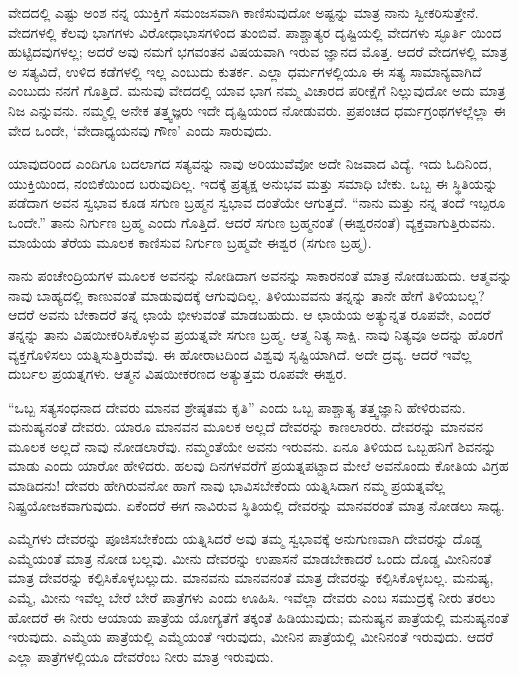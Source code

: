 ವೇದದಲ್ಲಿ ಎಷ್ಟು ಅಂಶ ನನ್ನ ಯುಕ್ತಿಗೆ ಸಮಂಜಸವಾಗಿ ಕಾಣಿಸುವುದೋ ಅಷ್ಟನ್ನು ಮಾತ್ರ ನಾನು ಸ್ವೀಕರಿಸುತ್ತೇನೆ. ವೇದಗಳಲ್ಲಿ ಕೆಲವು ಭಾಗಗಳು ವಿರೋಧಾಭಾಸಗಳಿಂದ ತುಂಬಿವೆ. ಪಾಶ್ಚಾತ್ಯರ ದೃಷ್ಟಿಯಲ್ಲಿ ವೇದಗಳು ಸ್ಫೂರ್ತಿ ಯಿಂದ ಹುಟ್ಟಿದವುಗಳಲ್ಲ; ಅದರೆ ಅವು ನಮಗೆ ಭಗವಂತನ ವಿಷಯವಾಗಿ ಇರುವ ಜ್ಞಾನದ ಮೊತ್ತ. ಆದರೆ ವೇದಗಳಲ್ಲಿ ಮಾತ್ರ ಅ ಸತ್ಯವಿದೆ, ಉಳಿದ ಕಡೆಗಳಲ್ಲಿ ಇಲ್ಲ ಎಂಬುದು ಕುತರ್ಕ. ಎಲ್ಲಾ ಧರ್ಮಗಳಲ್ಲಿಯೂ ಈ ಸತ್ಯ ಸಾಮಾನ್ಯವಾಗಿದೆ ಎಂಬುದು ನನಗೆ ಗೊತ್ತಿದೆ. ಮನುವು ವೇದದಲ್ಲಿ ಯಾವ ಭಾಗ ನಮ್ಮ ವಿಚಾರದ ಪರೀಕ್ಷೆಗೆ ನಿಲ್ಲುವುದೋ ಅದು ಮಾತ್ರ ನಿಜ ಎನ್ನುವನು. ನಮ್ಮಲ್ಲಿ ಅನೇಕ ತತ್ತ್ವಜ್ಞರು ಇದೇ ದೃಷ್ಟಿಯಂದ ನೋಡುವರು. ಪ್ರಪಂಚದ ಧರ್ಮಗ್ರಂಥಗಳಲ್ಲೆಲ್ಲಾ ಈ ವೇದ ಒಂದೇ, ‘ವೇದಾಧ್ಯಯನವು ಗೌಣ’ ಎಂದು ಸಾರುವುದು.

ಯಾವುದರಿಂದ ಎಂದಿಗೂ ಬದಲಾಗದ ಸತ್ಯವನ್ನು ನಾವು ಅರಿಯುವೆವೋ ಅದೇ ನಿಜವಾದ ವಿದ್ಯೆ. ಇದು ಓದಿನಿಂದ, ಯುಕ್ತಿಯಿಂದ, ನಂಬಿಕೆಯಿಂದ ಬರುವುದಿಲ್ಲ. ಇದಕ್ಕೆ ಪ್ರತ್ಯಕ್ಷ ಅನುಭವ ಮತ್ತು ಸಮಾಧಿ ಬೇಕು. ಒಬ್ಬ ಈ ಸ್ಥಿತಿಯನ್ನು ಪಡೆದಾಗ ಅವನ ಸ್ವಭಾವ ಕೂಡ ಸಗುಣ ಬ್ರಹ್ಮನ ಸ್ವಭಾವ ದಂತೆಯೇ ಆಗುತ್ತದೆ. “ನಾನು ಮತ್ತು ನನ್ನ ತಂದೆ ಇಬ್ಪರೂ ಒಂದೇ.” ತಾನು ನಿರ್ಗುಣ ಬ್ರಹ್ಮ ಎಂದು ಗೊತ್ತಿದೆ. ಆದರೆ ಸಗುಣ ಬ್ರಹ್ಮನಂತೆ (ಈಶ್ವರನಂತೆ) ವ್ಯಕ್ತವಾಗುತ್ತಿರುವನು. ಮಾಯೆಯ ತೆರೆಯ ಮೂಲಕ ಕಾಣಿಸುವ ನಿರ್ಗುಣ ಬ್ರಹ್ಮವೇ ಈಶ್ವರ (ಸಗುಣ ಬ್ರಹ್ಮ).

ನಾನು ಪಂಚೇಂದ್ರಿಯಗಳ ಮೂಲಕ ಅವನನ್ನು ನೋಡಿದಾಗ ಅವನನ್ನು ಸಾಕಾರನಂತೆ ಮಾತ್ರ ನೋಡಬಹುದು. ಆತ್ಮವನ್ನು ನಾವು ಬಾಹ್ಯದಲ್ಲಿ ಕಾಣುವಂತೆ ಮಾಡುವುದಕ್ಕೆ ಆಗುವುದಿಲ್ಲ. ತಿಳಿಯುವವನು ತನ್ನನ್ನು ತಾನೇ ಹೇಗೆ ತಿಳಿಯಬಲ್ಲ? ಆದರೆ ಅವನು ಬೇಕಾದರೆ ತನ್ನ ಛಾಯೆ ಭೀಳುವಂತೆ ಮಾಡಬಹುದು. ಆ ಛಾಯೆಯ ಅತ್ಯುನ್ನತ ರೂಪವೇ, ಎಂದರೆ ತನ್ನನ್ನು ತಾನು ವಿಷಯೀಕರಿಸಿಕೊಳ್ಳುವ ಪ್ರಯತ್ನವೇ ಸಗುಣ ಬ್ರಹ್ಮ. ಆತ್ಮ ನಿತ್ಯ ಸಾಕ್ಷಿ. ನಾವು ನಿತ್ಯವೂ ಅದನ್ನು ಹೊರಗೆ ವ್ಯಕ್ತಗೊಳಿಸಲು ಯತ್ನಿಸುತ್ತಿರುವೆವು. ಈ ಹೋರಾಟದಿಂದ ವಿಶ್ವವು ಸೃಷ್ಟಿಯಾಗಿದೆ. ಅದೇ ದ್ರವ್ಯ. ಆದರೆ ಇವೆಲ್ಲ ದುರ್ಬಲ ಪ್ರಯತ್ನಗಳು. ಆತ್ಮನ ವಿಷಯೀಕರಣದ ಅತ್ಯುತ್ತಮ ರೂಪವೇ ಈಶ್ವರ.

“ಒಬ್ಬ ಸತ್ಯಸಂಧನಾದ ದೇವರು ಮಾನವ ಶ್ರೇಷ್ಠತಮ ಕೃತಿ” ಎಂದು ಒಬ್ಬ ಪಾಶ್ಚಾತ್ಯ ತತ್ತ್ವಜ್ಞಾನಿ ಹೇಳಿರುವನು. ಮನುಷ್ಯನಂತೆ ದೇವರು. ಯಾರೂ ಮಾನವನ ಮೂಲಕ ಅಲ್ಲದೆ ದೇವರನ್ನು ಕಾಣಲಾರರು. ದೇವರನ್ನು ಮಾನವನ ಮೂಲಕ ಅಲ್ಲದೆ ನಾವು ನೋಡಲಾರೆವು. ನಮ್ಮಂತೆಯೇ ಅವನು ಇರುವನು. ಏನೂ ತಿಳಿಯದ ಒಬ್ಬಹನಿಗೆ ಶಿವನನ್ನು ಮಾಡು ಎಂದು ಯಾರೋ ಹೇಳಿದರು. ಹಲವು ದಿನಗಳವರೆಗೆ ಪ್ರಯತ್ನಪಟ್ಟಾದ ಮೇಲೆ ಅವನೊಂದು ಕೋತಿಯ ವಿಗ್ರಹ ಮಾಡಿದನು! ದೇವರು ಹೇಗಿರುವನೋ ಹಾಗೆ ನಾವು ಭಾವಿಸಬೇಕೆಂದು ಯತ್ನಿಸಿದಾಗ ನಮ್ಮ ಪ್ರಯತ್ನವೆಲ್ಲ ನಿಷ್ಪ್ರಯೋಜಕವಾಗುವುದು. ಏಕೆಂದರೆ ಈಗ ನಾವಿರುವ ಸ್ಥಿತಿಯಲ್ಲಿ ದೇವರನ್ನು ಮಾನವರಂತೆ ಮಾತ್ರ ನೋಡಲು ಸಾಧ್ಯ.

ಎಮ್ಮೆಗಳು ದೇವರನ್ನು ಪೂಜಿಸಬೇಕೆಂದು ಯತ್ನಿಸಿದರೆ ಅವು ತಮ್ಮ ಸ್ವಭಾವಕ್ಕೆ ಅನುಗುಣವಾಗಿ ದೇವರನ್ನು ದೊಡ್ಡ ಎಮ್ಮೆಯಂತೆ ಮಾತ್ರ ನೋಡ ಬಲ್ಲವು. ಮೀನು ದೇವರನ್ನು ಉಪಾಸನೆ ಮಾಡಬೇಕಾದರೆ ಒಂದು ದೊಡ್ಡ ಮೀನಿನಂತೆ ಮಾತ್ರ ದೇವರನ್ನು ಕಲ್ಪಿಸಿಕೊಳ್ಳಬಲ್ಲುದು. ಮಾನವನು ಮಾನವನಂತೆ ಮಾತ್ರ ದೇವರನ್ನು ಕಲ್ಪಿಸಿಕೊಳ್ಳಬಲ್ಲ. ಮನುಷ್ಯ, ಎಮ್ಮೆ, ಮೀನು ಇವೆಲ್ಲ ಬೇರೆ ಬೇರೆ ಪಾತ್ರೆಗಳು ಎಂದು ಊಹಿಸಿ. ಇವೆಲ್ಲಾ ದೇವರು ಎಂಬ ಸಮುದ್ರಕ್ಕೆ ನೀರು ತರಲು ಹೋದರೆ ಈ ನೀರು ಆಯಾಯ ಪಾತ್ರೆಯ ಯೋಗ್ಯತೆಗೆ ತಕ್ಕಂತೆ ಹಿಡಿಯುವುದು; ಮನುಷ್ಯನ ಪಾತ್ರೆಯಲ್ಲಿ ಮನುಷ್ಯನಂತೆ ಇರುವುದು. ಎಮ್ಮೆಯ ಪಾತ್ರೆಯಲ್ಲಿ ಎಮ್ಮೆಯಂತೆ ಇರುವುದು, ಮೀನಿನ ಪಾತ್ರೆಯಲ್ಲಿ ಮೀನಿನಂತೆ ಇರುವುದು. ಆದರೆ ಎಲ್ಲಾ ಪಾತ್ರೆಗಳಲ್ಲಿಯೂ ದೇವರೆಂಬ ನೀರು ಮಾತ್ರ ಇರುವುದು.

